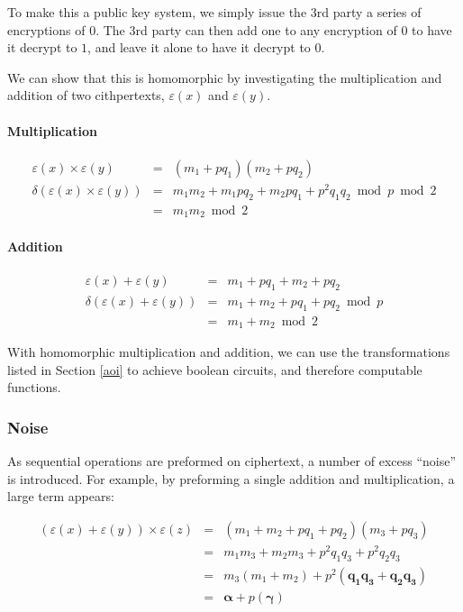 \documentclass[a4paper,10pt]{article}
\begin{document}
To make this a public key system, we simply issue the 3rd party a
series of encryptions of $0$. The 3rd party can then add one to any
encryption of $0$ to have it decrypt to $1$, and leave it alone to
have it decrypt to $0$.

We can show that this is homomorphic by investigating the
multiplication and addition of two cithpertexts, $ \varepsilon(x) $
and $ \varepsilon(y) $.

\paragraph{Multiplication}
\begin{eqnarray*}
\varepsilon(x) \times \varepsilon(y) &=& (m_1 + p q_1)(m_2 + p q_2)\\
\delta(\varepsilon(x) \times \varepsilon(y))&=& m_1m_2 + m_1pq_2 + m_2pq_1 + p^2q_1q_2 \bmod p \bmod 2\\
&=& m_1m_2 \bmod 2
\end{eqnarray*}

\paragraph{Addition}
\begin{eqnarray*}
\varepsilon(x) + \varepsilon(y) &=& m_1 + p q_1 + m_2 + p q_2\\
\delta(\varepsilon(x) + \varepsilon(y))&=& m_1 + m_2 + pq_1 + pq_2 \bmod p\\
&=& m_1 + m_2 \bmod 2
\end{eqnarray*}

With homomorphic multiplication and addition, we can use the
transformations listed in Section \ref{aoi} to achieve boolean
circuits, and therefore computable functions.

\subsubsection{Noise}
As sequential operations are preformed on ciphertext, a number of
excess ``noise'' is introduced. For example, by preforming a single
addition and multiplication, a large term appears:

\begin{eqnarray*}
(\varepsilon(x) + \varepsilon(y)) \times \varepsilon(z) &=&(m_1 + m_2 + pq_1 + pq_2)(m_3 + pq_3)\\
&=&m_1m_3 + m_2m_3 + p^2q_1q_3 + p^2q_2q_3\\
&=&m_3(m_1 + m_2) + p^2(\mathbf{q_1q_3 + q_2q_3})\\
&=&\mathbf{\alpha} + p(\mathbf{\gamma})
\end{eqnarray*}
\end{document}
